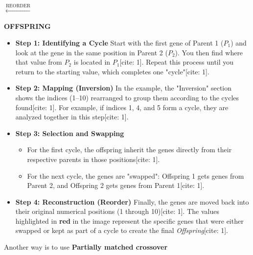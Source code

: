 \vspace{1em}
$\xleftarrow{\text{REORDER}}$
\vspace{1em}

\textbf{OFFSPRING} \\
\begin{center}
\end{center}

\begin{itemize}
    \item \textbf{Step 1: Identifying a Cycle} 
    Start with the first gene of Parent 1 ($P_1$) and look at the gene in the same position in Parent 2 ($P_2$). You then find where that value from $P_2$ is located in $P_1$[cite: 1]. Repeat this process until you return to the starting value, which completes one "cycle"[cite: 1].
    
    \item \textbf{Step 2: Mapping (Inversion)} 
    In the example, the "Inversion" section shows the indices (1--10) rearranged to group them according to the cycles found[cite: 1]. For example, if indices 1, 4, and 5 form a cycle, they are analyzed together in this step[cite: 1].
    
    \item \textbf{Step 3: Selection and Swapping} 
    \begin{itemize}
        \item For the first cycle, the offspring inherit the genes directly from their respective parents in those positions[cite: 1].
        \item For the next cycle, the genes are "swapped": Offspring 1 gets genes from Parent 2, and Offspring 2 gets genes from Parent 1[cite: 1].
    \end{itemize}
    
    \item \textbf{Step 4: Reconstruction (Reorder)} 
    Finally, the genes are moved back into their original numerical positions (1 through 10)[cite: 1]. The values highlighted in \textbf{red} in the image represent the specific genes that were either swapped or kept as part of a cycle to create the final \textit{Offspring}[cite: 1].
\end{itemize}


Another way is to use \textbf{Partially matched crossover}

